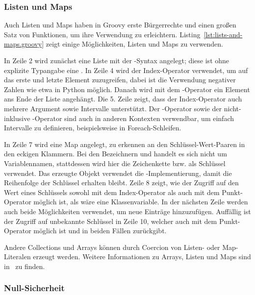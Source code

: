 \subsubsection{Listen und Maps}\label{subsubsec:listen-und-maps}

Auch Listen und Maps haben in Groovy erste Bürgerrechte und einen großen Satz von Funktionen, um ihre Verwendung zu erleichtern.
Listing~\ref{lst:lists-and-maps.groovy} zeigt einige Möglichkeiten, Listen und Maps zu verwenden.


In Zeile 2 wird zunächst eine Liste mit der \code{[]}-Syntax angelegt;
diese ist ohne explizite Typangabe eine .
In Zeile 4 wird der Index-Operator verwendet, um auf das erste und letzte Element zuzugreifen, dabei ist die Verwendung negativer Zahlen wie etwa in Python möglich.
Danach wird mit dem \code{<<}-Operator ein Element ans Ende der Liste angehängt.
Die 5. Zeile zeigt, dass der Index-Operator auch mehrere Argument sowie Intervalle unterstützt.
Der -Operator sowie der nicht-inklusive -Operator sind auch in anderen Kontexten verwendbar, um einfach Intervalle zu definieren, beispielsweise in Foreach-Schleifen.

In Zeile 7 wird eine Map angelegt, zu erkennen an den Schlüssel-Wert-Paaren in den eckigen Klammern.
Bei den Bezeichnern  und  handelt es sich nicht um Variablennamen, stattdessen wird hier die Zeichenkette  bzw.  als Schlüssel verwendet.
Das erzeugte Objekt verwendet die -Implementierung, damit die Reihenfolge der Schlüssel erhalten bleibt.
Zeile 8 zeigt, wie der Zugriff auf den Wert eines Schlüssels sowohl mit dem Index-Operator als auch mit dem Punkt-Operator möglich ist, als wäre  eine Klassenvariable.
In der nächsten Zeile werden auch beide Möglichkeiten verwendet, um neue Einträge hinzuzufügen.
Auffällig ist der Zugriff auf unbekannte Schlüssel in Zeile 10, welcher auch mit dem Punkt-Operator möglich ist und in beiden Fällen  zurückgibt.

Andere Collections und Arrays können durch Coercion von Listen- oder Map-Literalen erzeugt werden.
Weitere Informationen zu Arrays, Listen und Maps sind in~\cite[Abs.~7.-9.]{groovy-lang:syntax} zu finden.

\subsubsection{Null-Sicherheit}

